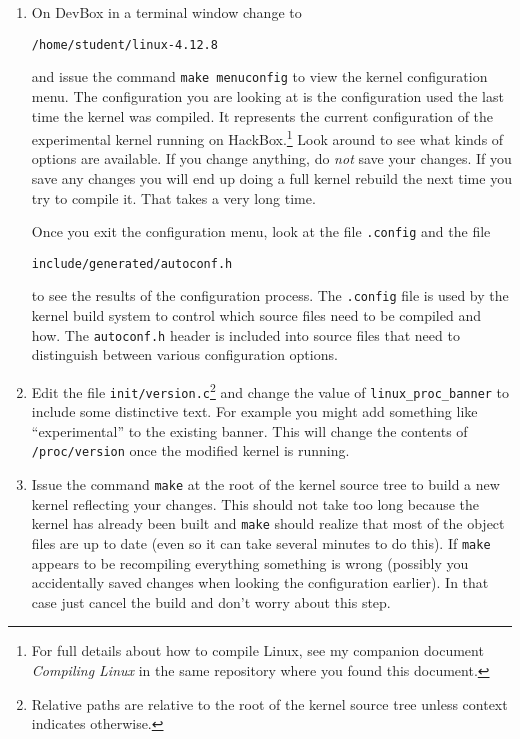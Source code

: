 \documentclass[twocolumn]{article}
\begin{document}
\begin{enumerate}
\item On DevBox in a terminal window change to
\begin{Verbatim}
/home/student/linux-4.12.8
\end{Verbatim}
  and issue the command \texttt{make menuconfig} to view the kernel configuration menu. The
  configuration you are looking at is the configuration used the last time the kernel was
  compiled. It represents the current configuration of the experimental kernel running on
  HackBox.\footnote{For full details about how to compile Linux, see my companion document
    \textit{Compiling Linux} in the same repository where you found this document.} Look around
  to see what kinds of options are available. If you change anything, do \emph{not} save your
  changes. If you save any changes you will end up doing a full kernel rebuild the next time you
  try to compile it. That takes a very long time.

  Once you exit the configuration menu, look at the file \texttt{.config} and the file
\begin{Verbatim}
include/generated/autoconf.h
\end{Verbatim}
  to see the results of the configuration process. The \texttt{.config} file is used by the
  kernel build system to control which source files need to be compiled and how. The
  \texttt{autoconf.h} header is included into source files that need to distinguish between
  various configuration options.

\item Edit the file \texttt{init/version.c}\footnote{Relative paths are relative to the root of
    the kernel source tree unless context indicates otherwise.} and change the value of
  \texttt{linux\_proc\_banner} to include some distinctive text. For example you might add
  something like ``experimental'' to the existing banner. This will change the contents of
  \texttt{/proc/version} once the modified kernel is running.

\item Issue the command \texttt{make} at the root of the kernel source tree to build a new
  kernel reflecting your changes. This should not take too long because the kernel has already
  been built and \texttt{make} should realize that most of the object files are up to date (even
  so it can take several minutes to do this). If \texttt{make} appears to be recompiling
  everything something is wrong (possibly you accidentally saved changes when looking the
  configuration earlier). In that case just cancel the build and don't worry about this step.


\end{enumerate}
\end{document}
